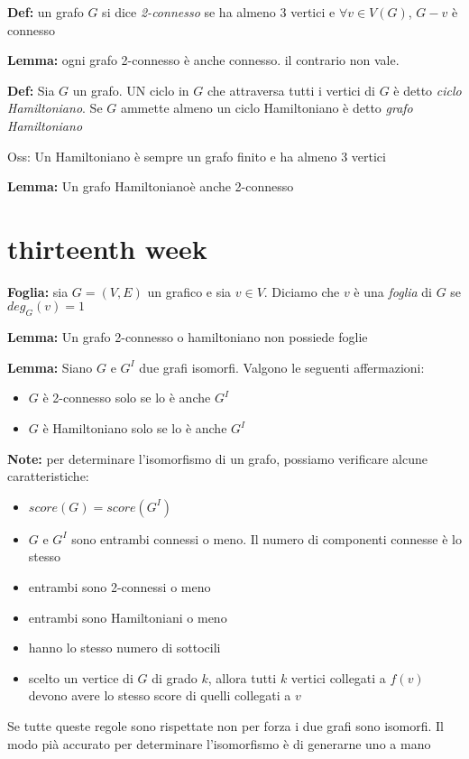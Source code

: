 \documentclass[11pt, letterpaper]{article}
\begin{document}
\textbf{Def:} un grafo $G$ si dice \textit{2-connesso} se ha almeno 3 vertici e $\forall v\in V(G)$, $G-v$ è connesso

\textbf{Lemma:} ogni grafo 2-connesso è anche connesso. il contrario non vale.

\textbf{Def:} Sia $G$ un grafo. UN ciclo in $G$ che attraversa tutti i vertici di $G$ è detto \textit{ciclo 
Hamiltoniano}. Se $G$ ammette almeno un ciclo Hamiltoniano è  detto \textit{grafo Hamiltoniano}

Oss: Un Hamiltoniano è  sempre un grafo finito e ha almeno 3 vertici

\textbf{Lemma:} Un grafo Hamiltonianoè anche 2-connesso


\newpage
\section{thirteenth week}
\textbf{Foglia:} sia $G=(V,E)$ un grafico e sia $v\in V$. Diciamo che $v$ è una \textit{foglia} di $G$ se 
$deg_{G}(v)=1$

\textbf{Lemma:} Un grafo 2-connesso o hamiltoniano non possiede foglie

\textbf{Lemma:} Siano $G$ e $G^{I}$ due grafi isomorfi. Valgono le seguenti affermazioni:
\begin{itemize}
    \item $G$ è 2-connesso solo se lo è anche $G^{I}$
    \item $G$ è Hamiltoniano solo se lo è anche $G^{I}$
\end{itemize}

\textbf{Note:} per determinare l'isomorfismo di un grafo, possiamo verificare alcune caratteristiche:
\begin{itemize}
    \item $score(G)=score(G^{I})$
    \item $G$ e $G^{I}$ sono entrambi connessi o meno. Il numero di componenti connesse è lo stesso
    \item entrambi sono 2-connessi o meno
    \item entrambi sono Hamiltoniani o meno
    \item hanno lo stesso numero di sottocili
    \item scelto un vertice di $G$ di grado $k$, allora tutti $k$ vertici collegati a $f(v)$ devono avere lo 
    stesso score di quelli collegati a $v$
\end{itemize}
Se tutte queste regole sono rispettate non per forza i due grafi sono isomorfi. Il modo pià accurato per determinare
l'isomorfismo è di generarne uno a mano 
\end{document}
